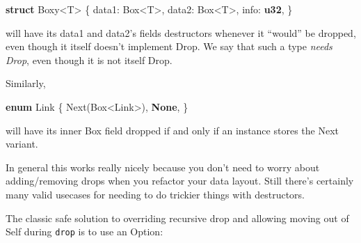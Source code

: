 \documentclass[a4paper,]{book}
\newenvironment{Shaded}{\begin{snugshade}}{\end{snugshade}}
\newcommand{\KeywordTok}[1]{\textcolor[rgb]{0.13,0.29,0.53}{\textbf{{#1}}}}
\newcommand{\NormalTok}[1]{{#1}}
\begin{document}
\begin{Shaded}
\begin{Highlighting}[]
\KeywordTok{struct} \NormalTok{Boxy<T> \{}
    \NormalTok{data1: Box<T>,}
    \NormalTok{data2: Box<T>,}
    \NormalTok{info: }\KeywordTok{u32}\NormalTok{,}
\NormalTok{\}}
\end{Highlighting}
\end{Shaded}

will have its data1 and data2's fields destructors whenever it ``would''
be dropped, even though it itself doesn't implement Drop. We say that
such a type \emph{needs Drop}, even though it is not itself Drop.

Similarly,

\begin{Shaded}
\begin{Highlighting}[]
\KeywordTok{enum} \NormalTok{Link \{}
    \NormalTok{Next(Box<Link>),}
    \KeywordTok{None}\NormalTok{,}
\NormalTok{\}}
\end{Highlighting}
\end{Shaded}

will have its inner Box field dropped if and only if an instance stores
the Next variant.

In general this works really nicely because you don't need to worry
about adding/removing drops when you refactor your data layout. Still
there's certainly many valid usecases for needing to do trickier things
with destructors.

The classic safe solution to overriding recursive drop and allowing
moving out of Self during \texttt{drop} is to use an Option:
\end{document}
